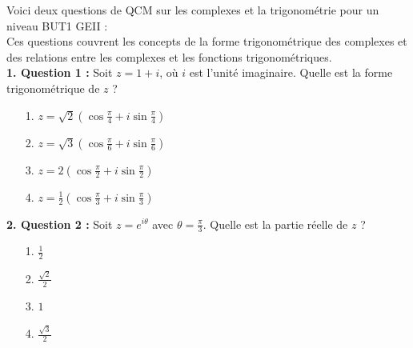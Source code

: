 \documentclass[french]{article}
\begin{document}
Voici deux questions de QCM sur les complexes et la trigonométrie pour un niveau BUT1 GEII : \\

Ces questions couvrent les concepts de la forme trigonométrique des complexes et des relations entre les complexes et les fonctions trigonométriques. \\

\textbf{1. Question 1 :}
   	Soit \( z = 1 + i \), où \( i \) est l’unité imaginaire. Quelle est la forme trigonométrique de \( z \) ?
	
	\begin{itemize}
		\item[1.] \( z = \sqrt{2} \left( \cos \frac{\pi}{4} + i \sin \frac{\pi}{4} \right) \)
		\item[2.] \( z = \sqrt{3} \left( \cos \frac{\pi}{6} + i \sin \frac{\pi}{6} \right) \)
		\item[3.] \( z = 2 \left( \cos \frac{\pi}{2} + i \sin \frac{\pi}{2} \right) \)
		\item[4.] \( z = \frac{1}{2} \left( \cos \frac{\pi}{3} + i \sin \frac{\pi}{3} \right) \)
	\end{itemize}

\textbf{2. Question 2 :}
	Soit \( z = e^{i \theta} \) avec \( \theta = \frac{\pi}{3} \). Quelle est la partie réelle de \( z \) ?
	
	\begin{itemize}
		\item[1.] \( \frac{1}{2} \)
		\item[2.] \( \frac{\sqrt{2}}{2} \)
		\item[3.] \( 1 \)
		\item[4.] \( \frac{\sqrt{3}}{2} \)
   	\end{itemize}
\end{document}
